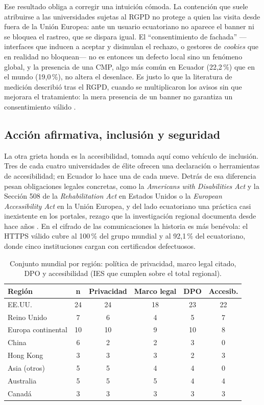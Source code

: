 \documentclass[pdflatex,sn-basic,Numbered]{sn-jnl}
\theoremstyle{thmstyleone}
\theoremstyle{thmstyletwo}
\theoremstyle{thmstylethree}
\begin{document}
Ese resultado obliga a corregir una intuición cómoda. La contención que suele atribuirse a las universidades sujetas al RGPD no protege a quien las visita desde fuera de la Unión Europea: ante un usuario ecuatoriano no aparece el banner ni se bloquea el rastreo, que se dispara igual. El ``consentimiento de fachada'' ---interfaces que inducen a aceptar y disimulan el rechazo, o gestores de \emph{cookies} que en realidad no bloquean--- no es entonces un defecto local sino un fenómeno global, y la presencia de una CMP, algo más común en Ecuador (22,2\,\%) que en el mundo (19,0\,\%), no altera el desenlace. Es justo lo que la literatura de medición describió tras el RGPD, cuando se multiplicaron los avisos sin que mejorara el tratamiento: la mera presencia de un banner no garantiza un consentimiento válido \citep{degeling2019value,kretschmer2021cookie,nouwens2020dark,gray2021dark,habib2022okay}.

\subsection{Acci\'on afirmativa, inclusi\'on y seguridad}
La otra grieta honda es la accesibilidad, tomada aquí como vehículo de inclusión. Tres de cada cuatro universidades de élite ofrecen una declaración o herramientas de accesibilidad; en Ecuador lo hace una de cada nueve. Detrás de esa diferencia pesan obligaciones legales concretas, como la \emph{Americans with Disabilities Act} \citep{ada1990} y la Sección 508 de la \emph{Rehabilitation Act} \citep{section508} en Estados Unidos o la \emph{European Accessibility Act} \citep{eaa2019} en la Unión Europea, y del lado ecuatoriano una práctica casi inexistente en los portales, rezago que la investigación regional documenta desde hace años \citep{campoverdemolina2023accessibility,acostavargas2020dataset}. En el cifrado de las comunicaciones la historia es más benévola: el HTTPS válido cubre al 100\,\% del grupo mundial y al 92,1\,\% del ecuatoriano, donde cinco instituciones cargan con certificados defectuosos.

\begin{table}[!htbp]
	\centering
	\caption{Conjunto mundial por regi\'on: pol\'itica de privacidad, marco legal citado, DPO y accesibilidad (IES que cumplen sobre el total regional).}
	\label{tab:reg}
	\small
	\begin{tabular}{@{}lccccc@{}}
		\toprule
		\textbf{Regi\'on} & \textbf{n} & \textbf{Privacidad} & \textbf{Marco legal} & \textbf{DPO} & \textbf{Accesib.} \\
		\midrule
	EE.UU. & 24 & 24 & 18 & 23 & 22 \\
	Reino Unido & 7 & 6 & 4 & 5 & 7 \\
	Europa continental & 10 & 10 & 9 & 10 & 8 \\
	China & 6 & 2 & 2 & 3 & 0 \\
	Hong Kong & 3 & 3 & 3 & 2 & 3 \\
	Asia (otros) & 5 & 5 & 4 & 4 & 0 \\
	Australia & 5 & 5 & 5 & 4 & 4 \\
	Canadá & 3 & 3 & 3 & 3 & 3 \\
		\bottomrule
	\end{tabular}
\end{table}
\end{document}
